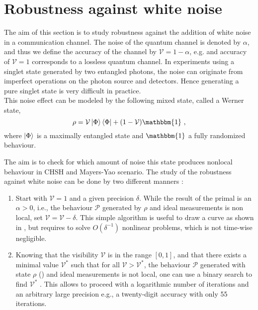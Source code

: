 \section{Robustness against white noise}
\label{sec:noise}

The aim of this section is to study robustness against the addition of white
noise in a communication channel. The noise of the quantum channel is denoted by
$\alpha$, and thus we define the accuracy of the channel by $\mathcal{V} = 1 -
\alpha$, e.g. and accuracy of $\mathcal{V} = 1$ corresponds to a lossless
quantum channel. In experiments using a singlet state generated by two entangled
photons, the noise can originate from imperfect operations on the photon source
and detectors. Hence generating a pure singlet state is very difficult in
practice.\\

This noise effect can be modeled by the following mixed state, called a Werner state,
\begin{equation}\label{eq:werner-state}
    \rho = \mathcal{V} \ket{\Phi}\bra{\Phi} + (1-\mathcal{V}) \mathbbm{1}\text{ ,}
\end{equation}
where $\ket{\Phi}$ is a maximally entangled state and $\mathbbm{1}$ a fully
randomized behaviour.

The aim is to check for which amount of noise this state produces nonlocal behaviour
in CHSH and Mayers-Yao scenario.
The study of the robustness against white noise can be done by two different
manners :
\begin{enumerate}
    \item Start with  $\mathcal{V} = 1$ and a given precision $\delta$. While
        the result of the primal is an $\alpha > 0$, i.e., the behaviour $\mathcal P$ generated by $\rho$ and ideal measurements is non local, set
        $\mathcal{V} = \mathcal{V} - \delta $. This simple algorithm is useful
        to draw a curve as shown in , but requires
        to solve $O(\delta^{-1})$ nonlinear problems, which is not time-wise negligible.

    \item Knowing that the visibility $\mathcal{V}$ is in the range $[0, 1]$, and
        that there exists a minimal value $\mathcal{V}^*$ such that for all
        $\mathcal{V} > \mathcal{V}^*$, the behaviour $\mathcal P$ generated with state $\rho$ () and ideal measurements is not local, one can use a binary search
        to find $\mathcal{V}^*$ . This allows to proceed with a logarithmic
        number of iterations and an arbitrary large precision e.g., a twenty-digit
        accuracy with only 55 iterations. 
\end{enumerate}



